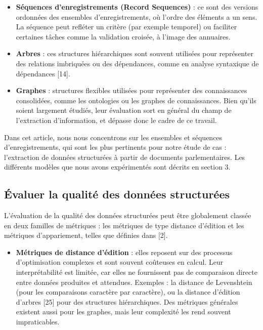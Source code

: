 \begin{itemize}
\item \textbf{Séquences d’enregistrements (Record Sequences)} : ce sont des versions ordonnées des ensembles d’enregistrements, où l’ordre des éléments a un sens. La séquence peut refléter un critère (par exemple temporel) ou faciliter certaines tâches comme la validation croisée, à l’image des annuaires.
\end{itemize}

\begin{itemize}
\item \textbf{Arbres} : ces structures hiérarchiques sont souvent utilisées pour représenter des relations imbriquées ou des dépendances, comme en analyse syntaxique de dépendances [14].
\end{itemize}

\begin{itemize}
\item \textbf{Graphes} : structures flexibles utilisées pour représenter des connaissances consolidées, comme les ontologies ou les graphes de connaissances. Bien qu’ils soient largement étudiés, leur évaluation sort en général du champ de l’extraction d’information, et dépasse donc le cadre de ce travail.
\end{itemize}

Dans cet article, nous nous concentrons sur les ensembles et séquences d’enregistrements, qui sont les plus pertinents pour notre étude de cas : l’extraction de données structurées à partir de documents parlementaires. Les différents modèles que nous avons expérimentés sont décrits en section 3.

\subsection{Évaluer la qualité des données structurées}

L’évaluation de la qualité des données structurées peut être globalement classée en deux familles de métriques : les métriques de type distance d’édition et les métriques d’appariement, telles que définies dans [2].

\begin{itemize}
\item \textbf{Métriques de distance d’édition} : elles reposent sur des processus d’optimisation complexes et sont souvent coûteuses en calcul. Leur interprétabilité est limitée, car elles ne fournissent pas de comparaison directe entre données produites et attendues. Exemples : la distance de Levenshtein (pour les comparaisons caractère par caractère), ou la distance d’édition d’arbres [25] pour des structures hiérarchiques. Des métriques générales existent aussi pour les graphes, mais leur complexité les rend souvent impraticables.
\end{itemize}

